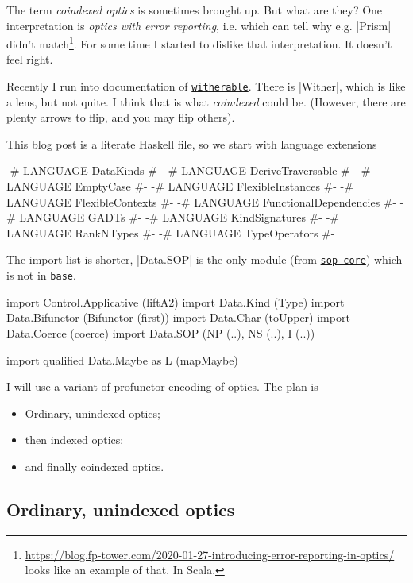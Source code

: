 The term \emph{coindexed optics} is sometimes brought up.
But what are they?
One interpretation is \emph{optics with error reporting},
i.e. which can tell why e.g. |Prism| didn't match\footnote{%
\url{https://blog.fp-tower.com/2020-01-27-introducing-error-reporting-in-optics/} looks like an example of that. In Scala.
}.
For some time I started to dislike that interpretation.
It doesn't feel right.

Recently I run into documentation of
\href{https://hackage.haskell.org/package/witherable}{\texttt{witherable}}.
There is |Wither|, which is like a lens, but not quite.
I think that is what \emph{coindexed} could be.
(However, there are plenty arrows to flip, and you may flip others).

This blog post is a literate Haskell file, so we start with
language extensions

\begin{code}
{-# LANGUAGE DataKinds #-}
{-# LANGUAGE DeriveTraversable #-}
{-# LANGUAGE EmptyCase #-}
{-# LANGUAGE FlexibleInstances #-}
{-# LANGUAGE FlexibleContexts #-}
{-# LANGUAGE FunctionalDependencies #-}
{-# LANGUAGE GADTs #-}
{-# LANGUAGE KindSignatures #-}
{-# LANGUAGE RankNTypes #-}
{-# LANGUAGE TypeOperators #-}
\end{code}

The import list is shorter,
|Data.SOP| is the only module (from
\href{https://hackage.haskell.org/package/sop-core}{\texttt{sop-core}})
which is not in \texttt{base}.

\begin{code}
import Control.Applicative (liftA2)
import Data.Kind           (Type)
import Data.Bifunctor      (Bifunctor (first))
import Data.Char           (toUpper)
import Data.Coerce         (coerce)
import Data.SOP            (NP (..), NS (..), I (..))

import qualified Data.Maybe as L (mapMaybe)
\end{code}

I will use a variant of profunctor encoding of optics. The plan is
\begin{itemize}
\item Ordinary, unindexed optics;
\item then indexed optics;
\item and finally coindexed optics.
\end{itemize}

\subsection{Ordinary, unindexed optics}

